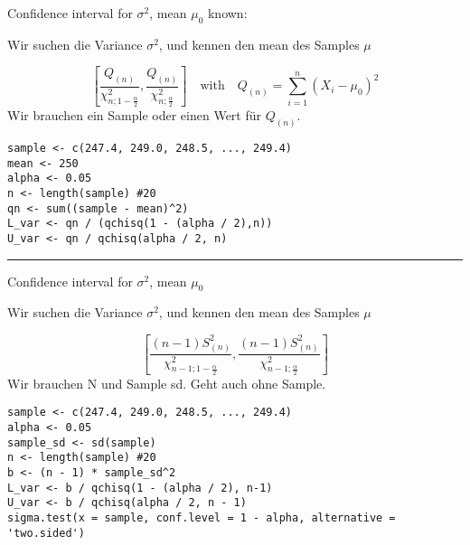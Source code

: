 \begin{multicols*}{2}
\begin{center}
     \Large{Confidence interval for $\sigma^2$, mean $\mu_0$ known:}
\end{center}
\begin{center}
     \Large{Wir suchen die Variance $\sigma^2$, und kennen den mean des Samples $\mu$}
\end{center}

$$
\left[
\frac{Q_{(n)}}{\chi^2_{n;1-\frac{\alpha}{2}}},
\frac{Q_{(n)}}{\chi^2_{n;\frac{\alpha}{2}}}
\right]
\quad \text{with} \quad  Q_{(n)} = \sum_{i=1}^{n} (X_i - \mu_0)^2
$$
Wir brauchen ein Sample oder einen Wert für $Q_{(n)}$.
\begin{lstlisting}
sample <- c(247.4, 249.0, 248.5, ..., 249.4)
mean <- 250
alpha <- 0.05
n <- length(sample) #20
qn <- sum((sample - mean)^2)
L_var <- qn / (qchisq(1 - (alpha / 2),n))
U_var <- qn / qchisq(alpha / 2, n)
\end{lstlisting}
\hrule

\begin{center}
     \Large{Confidence interval for $\sigma^2$, mean $\mu_0$ \color{red}{UNKNOWN:}}
\end{center}
\begin{center}
     \Large{Wir suchen die Variance $\sigma^2$, und kennen den mean des Samples $\mu$ \color{red}{NICHT}}
\end{center}
$$
\left[
\frac{(n-1)S^2_{(n)}}{\chi^2_{n-1;1-\frac{\alpha}{2}}},
\frac{(n-1)S^2_{(n)}}{\chi^2_{n-1;\frac{\alpha}{2}}}
\right]$$
Wir brauchen N und Sample sd.
Geht auch ohne Sample.
\begin{lstlisting}
sample <- c(247.4, 249.0, 248.5, ..., 249.4)
alpha <- 0.05
sample_sd <- sd(sample)
n <- length(sample) #20
b <- (n - 1) * sample_sd^2
L_var <- b / qchisq(1 - (alpha / 2), n-1)
U_var <- b / qchisq(alpha / 2, n - 1)
sigma.test(x = sample, conf.level = 1 - alpha, alternative = 'two.sided')
\end{lstlisting}

\end{multicols*}